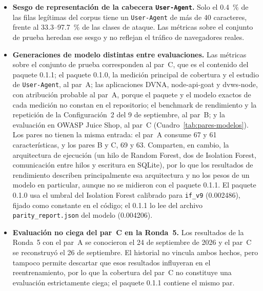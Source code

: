 \begin{itemize}
    comparte payloads con el entrenamiento (Procedimiento~4.2). Su tasa de bloqueo en ataques
    confirma que la librería instalada desde npm funciona en aplicaciones ajenas al proyecto, pero
    no mide la detección de payloads nuevos; esa medición corresponde al corpus limpio (M2). Sus
    tasas de bloqueo sobre tráfico legítimo no dependen de ese corpus y son la evidencia principal
    de generalización.
    \item \textbf{Sesgo de representación de la cabecera \texttt{User-Agent}.} Solo el 0.4~\%
    de las filas legítimas del corpus tiene un \texttt{User-Agent} de más de 40 caracteres,
    frente al 33.3--97.7~\% de las clases de ataque. Las métricas sobre el conjunto de prueba
    heredan ese sesgo y no reflejan el tráfico de navegadores reales.
    \item \textbf{Generaciones de modelo distintas entre evaluaciones.} Las métricas sobre el
    conjunto de prueba corresponden al par~C, que es el contenido del paquete 0.1.1; el paquete 0.1.0, la
    medición principal de cobertura y el estudio de \texttt{User-Agent}, al par~A; las aplicaciones DVNA, node-api-goat y
    dvws-node, con atribución probable al par~A, porque el paquete y el modelo exactos de cada
    medición no constan en el repositorio; el benchmark de rendimiento y la repetición de la
    Configuración~2 del 9 de septiembre, al par~B; y la evaluación en OWASP Juice Shop, al par~C
    (Cuadro~\ref{tab:pares-modelos}). Los pares no tienen la misma entrada: el par~A consume 67 y 61
    características, y los pares B y C, 69 y 63. Comparten, en cambio, la arquitectura de ejecución
    (un hilo de Random Forest, dos de Isolation Forest, comunicación entre hilos y escritura en
    SQLite), por lo que los resultados de rendimiento describen principalmente esa arquitectura y no
    los pesos de un modelo en particular, aunque no se midieron con el paquete 0.1.1. El paquete 0.1.0
    usa el umbral del Isolation Forest calibrado para \texttt{if\_v9} (0.002486), fijado como
    constante en el código; el 0.1.1 lo lee del archivo \texttt{parity\_report.json} del modelo (0.004206).
    \item \textbf{Evaluación no ciega del par~C en la Ronda~5.} Los resultados de la Ronda~5 con el
    par~A se conocieron el 24 de septiembre de 2026 y el par~C se reconstruyó el 26 de septiembre.
    El historial no vincula ambos hechos, pero tampoco permite descartar que esos resultados
    influyeran en el reentrenamiento, por lo que la cobertura del par~C no constituye una
    evaluación estrictamente ciega; el paquete 0.1.1 contiene el mismo par.

\end{itemize}
